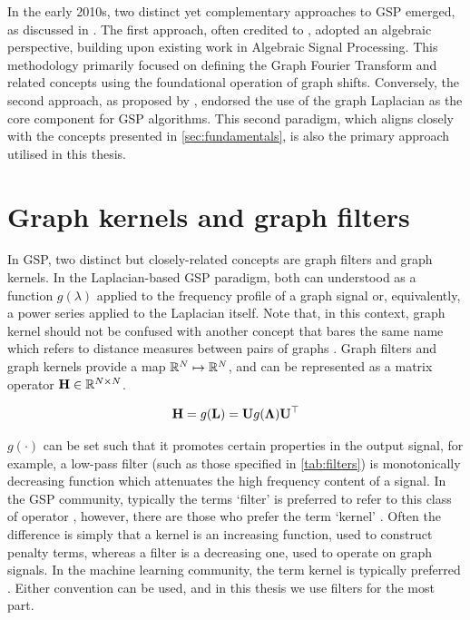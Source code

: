 In the early 2010s, two distinct yet complementary approaches to GSP emerged, as discussed in \cite{Leus2023}. The first approach, often credited to \cite{Sandryhaila2013,Sandryhaila2013b}, adopted an algebraic perspective, building upon existing work in Algebraic Signal Processing. This methodology primarily focused on defining the Graph Fourier Transform and related concepts using the foundational operation of graph shifts. Conversely, the second approach, as proposed by  \cite{Hammond2011,Shuman2013}, endorsed the use of the graph Laplacian as the core component for GSP algorithms. This second paradigm, which aligns closely with the concepts presented in \cref{sec:fundamentals}, is also the primary approach utilised in this thesis.


\section{Graph kernels and graph filters}

\label{sec:graph_kernels}

In GSP, two distinct but closely-related concepts are graph filters and graph kernels. In the Laplacian-based GSP paradigm, both can understood as a function $g(\lambda)$ applied to the frequency profile of a graph signal or, equivalently, a power series applied to the Laplacian itself. Note that, in this context, graph kernel should not be confused with another concept that bares the same name which refers to distance measures between pairs of graphs \citep{Kriege2020}. Graph filters and graph kernels provide a map $\mathbb{R}^N \mapsto \mathbb{R}^N$, and can be represented as a matrix operator $\mathbf{H} \in \mathbb{R}^{N \times N}$.

\begin{equation}
    \mathbf{H} = g(\mathbf{L}) = \mathbf{U} g(\mathbf{\Lambda}) \mathbf{U}^\top
\end{equation}

 $g(\cdot)$ can be set such that it promotes certain properties in the output signal, for example, a low-pass filter (such as those specified in \cref{tab:filters}) is monotonically decreasing function which attenuates the high frequency content of a signal. In the GSP community, typically the terms `filter' is preferred to refer to this class of operator \citep{Shuman2013}, however, there are those who prefer the term `kernel' \citep{Ioannidis2016,Romero2017}. Often the difference is simply that a kernel is an increasing function, used to construct penalty terms, whereas a filter is a decreasing one, used to operate on graph signals. In the machine learning community, the term kernel is typically preferred \cite{Kondor2002,Smola2003}. Either convention can be used, and in this thesis we use filters for the most part. 


